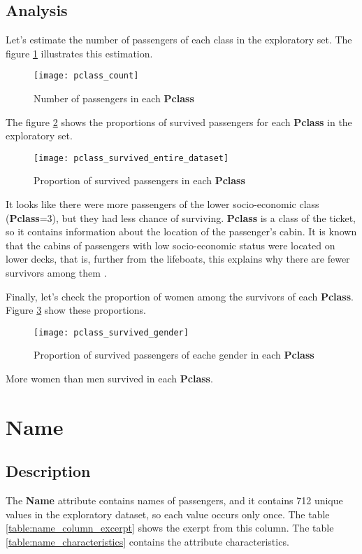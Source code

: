 \subsection{Analysis}
Let's estimate the number of passengers of each class in the exploratory
set. The figure \ref{pic:pclass_count} illustrates this estimation.

\begin{figure}[!ht]
    \centering
    \texttt{[image: pclass\_count]}
    \caption{Number of passengers in each \textbf{Pclass}}
    \label{pic:pclass_count}
\end{figure}

The figure \ref{pic:pclass_survived_entire_dataset} shows the proportions
of survived passengers for each \textbf{Pclass} in the exploratory set.

\begin{figure}[!ht]
    \centering
    \texttt{[image: pclass\_survived\_entire\_dataset]}
    \caption{Proportion of survived passengers in each \textbf{Pclass}}
    \label{pic:pclass_survived_entire_dataset}
\end{figure}

It looks like there were more passengers of the lower socio-economic class 
(\textbf{Pclass}=3), but they had less chance of surviving. \textbf{Pclass}
is a class of the ticket, so it contains information about the location 
of the passenger's cabin. It is known that the cabins of passengers with 
low socio-economic status were located on lower decks, that is, further 
from the lifeboats, this explains why there are fewer survivors among them
\cite{titanic-wikipedia}.

Finally, let's check the proportion of women among the survivors of each
\textbf{Pclass}. Figure \ref{pic:pclass_survived_gender} show these 
proportions.

\begin{figure}[!ht]
    \centering
    \texttt{[image: pclass\_survived\_gender]}
    \caption{Proportion of survived passengers of eache gender in each \textbf{Pclass}}
    \label{pic:pclass_survived_gender}
\end{figure}

More women than men survived in each \textbf{Pclass}.


\section{Name} \label{section:Name}
\subsection{Description}
The \textbf{Name} attribute contains names of passengers, and it contains
712 unique values in the exploratory dataset, so each value occurs only
once. The table \ref{table:name_column_excerpt} shows the exerpt from 
this column. The table \ref{table:name_characteristics} contains the 
attribute characteristics.

